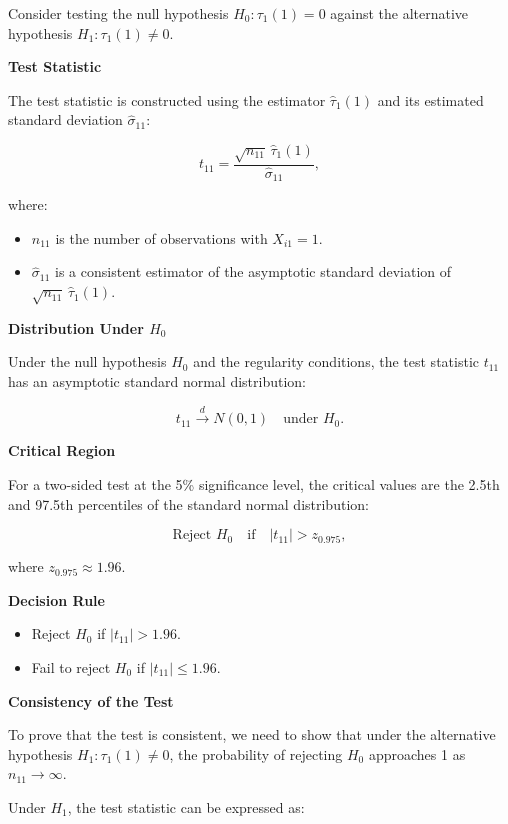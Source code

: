 \documentclass{article}
\begin{document}
Consider testing the null hypothesis \( H_0: \tau_1(1) = 0 \) against the alternative hypothesis \( H_1: \tau_1(1) \neq 0 \).

\textbf{Test Statistic}

The test statistic is constructed using the estimator \( \hat{\tau}_1(1) \) and its estimated standard deviation \( \hat{\sigma}_{11} \):

\[
t_{11} = \frac{\sqrt{n_{11}} \, \hat{\tau}_1(1)}{\hat{\sigma}_{11}},
\]

where:
\begin{itemize}
    \item \( n_{11} \) is the number of observations with \( X_{i1} = 1 \).
    \item \( \hat{\sigma}_{11} \) is a consistent estimator of the asymptotic standard deviation of \( \sqrt{n_{11}} \, \hat{\tau}_1(1) \).
\end{itemize}

\textbf{Distribution Under \( H_0 \)}

Under the null hypothesis \( H_0 \) and the regularity conditions, the test statistic \( t_{11} \) has an asymptotic standard normal distribution:

\[
t_{11} \xrightarrow{d} N(0,1) \quad \text{under } H_0.
\]

\textbf{Critical Region}

For a two-sided test at the 5\% significance level, the critical values are the 2.5th and 97.5th percentiles of the standard normal distribution:

\[
\text{Reject } H_0 \quad \text{if} \quad |t_{11}| > z_{0.975},
\]

where \( z_{0.975} \approx 1.96 \).

\textbf{Decision Rule}

\begin{itemize}
    \item Reject \( H_0 \) if \( |t_{11}| > 1.96 \).
    \item Fail to reject \( H_0 \) if \( |t_{11}| \leq 1.96 \).
\end{itemize}

\textbf{Consistency of the Test}

To prove that the test is consistent, we need to show that under the alternative hypothesis \( H_1: \tau_1(1) \neq 0 \), the probability of rejecting \( H_0 \) approaches 1 as \( n_{11} \to \infty \).

Under \( H_1 \), the test statistic can be expressed as:
\end{document}
